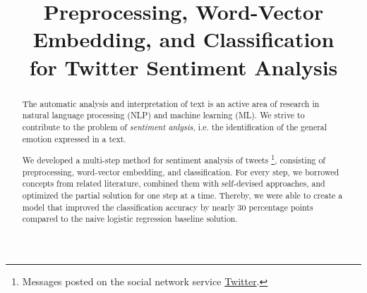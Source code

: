 \documentclass[10pt,conference,compsocconf]{styles/IEEEtran}
\begin{document}
	
\title{\vspace{-1.5cm}Preprocessing, Word-Vector Embedding, and Classification\\ for Twitter Sentiment Analysis}
\author{
  \and
  \and
  \and
}
\maketitle

\begin{abstract}
  The automatic analysis and interpretation of text is an active area of research in natural language processing (NLP) and machine learning (ML). We strive to contribute to the problem of \textit{sentiment anlysis}, i.e. the identification of the general emotion expressed in a text.
  
  We developed a multi-step method for sentiment analysis of tweets \footnote{Messages posted on the social network service \href{https://www.twitter.com}{Twitter}.}, consisting of preprocessing, word-vector embedding, and classification. For every step, we borrowed concepts from related literature, combined them with self-devised approaches, and optimized the partial solution for one step at a time. Thereby, we were able to create a model that improved the classification accuracy by nearly 30 percentage points compared to the naive logistic regression baseline solution.
\end{abstract}







\pagebreak

\end{document}
